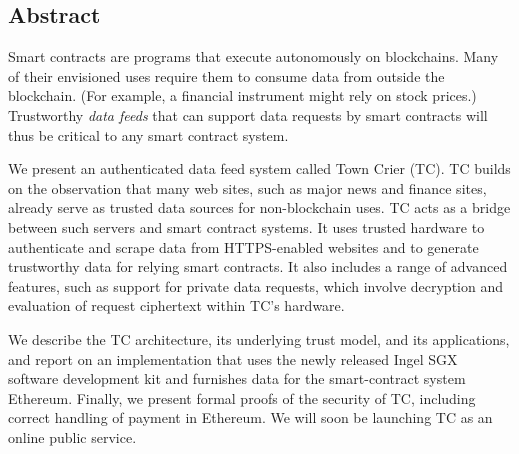 \subsection*{Abstract}
Smart contracts are programs that execute autonomously on blockchains. Many of their envisioned uses require them to consume data from outside the blockchain. (For example, a financial instrument might rely on stock prices.) Trustworthy {\em data feeds} that can support data requests by smart contracts will thus be critical to any smart contract system. 

	We present an authenticated data feed system called Town Crier (TC). TC builds on the observation that many web sites, such as major news and finance sites, already serve as trusted data sources for non-blockchain uses. TC acts as a bridge between such servers and smart contract systems. It uses trusted hardware to authenticate and scrape data from HTTPS-enabled websites and to generate trustworthy data for relying smart contracts. It also includes a range of advanced features, such as support for private data requests, which involve decryption and evaluation of request ciphertext  within TC's hardware.
	
	We describe the TC architecture, its underlying trust model, and its applications, and report on an implementation that uses the newly released Ingel SGX software development kit and furnishes data for the smart-contract system Ethereum.  Finally, we present formal proofs of the security of TC, including correct handling of payment in Ethereum. We will soon be launching TC as an online public service.

